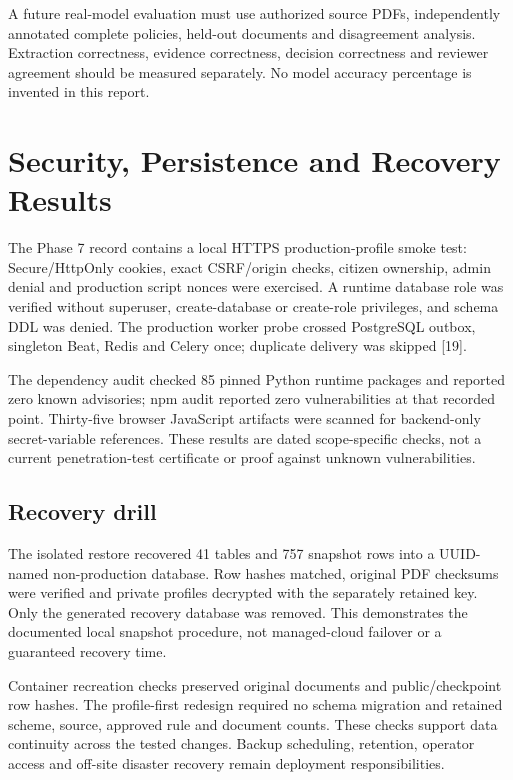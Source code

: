 \documentclass[12pt,a4paper,twoside]{report}
\begin{document}
A future real-model evaluation must use authorized source PDFs, independently annotated complete policies, held-out documents and disagreement analysis. Extraction correctness, evidence correctness, decision correctness and reviewer agreement should be measured separately. No model accuracy percentage is invented in this report.

\section{Security, Persistence and Recovery Results}

The Phase 7 record contains a local HTTPS production-profile smoke test: Secure/HttpOnly cookies, exact CSRF/origin checks, citizen ownership, admin denial and production script nonces were exercised. A runtime database role was verified without superuser, create-database or create-role privileges, and schema DDL was denied. The production worker probe crossed PostgreSQL outbox, singleton Beat, Redis and Celery once; duplicate delivery was skipped [19].

The dependency audit checked 85 pinned Python runtime packages and reported zero known advisories; npm audit reported zero vulnerabilities at that recorded point. Thirty-five browser JavaScript artifacts were scanned for backend-only secret-variable references. These results are dated scope-specific checks, not a current penetration-test certificate or proof against unknown vulnerabilities.

\subsection*{Recovery drill}

The isolated restore recovered 41 tables and 757 snapshot rows into a UUID-named non-production database. Row hashes matched, original PDF checksums were verified and private profiles decrypted with the separately retained key. Only the generated recovery database was removed. This demonstrates the documented local snapshot procedure, not managed-cloud failover or a guaranteed recovery time.

Container recreation checks preserved original documents and public/checkpoint row hashes. The profile-first redesign required no schema migration and retained scheme, source, approved rule and document counts. These checks support data continuity across the tested changes. Backup scheduling, retention, operator access and off-site disaster recovery remain deployment responsibilities.
\end{document}
